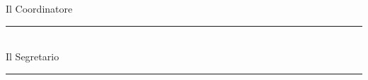\documentclass[11pt]{article}
\begin{document}
\vfill
\begin{center}
\begin{multicols}{2}
	Il Coordinatore\\[12pt] \rule{4cm}{0.4pt}\\
	Il Segretario\\[12pt]	\rule{4cm}{0.4pt}\\ 
	\end{multicols}
\end{center}

\end{document}
